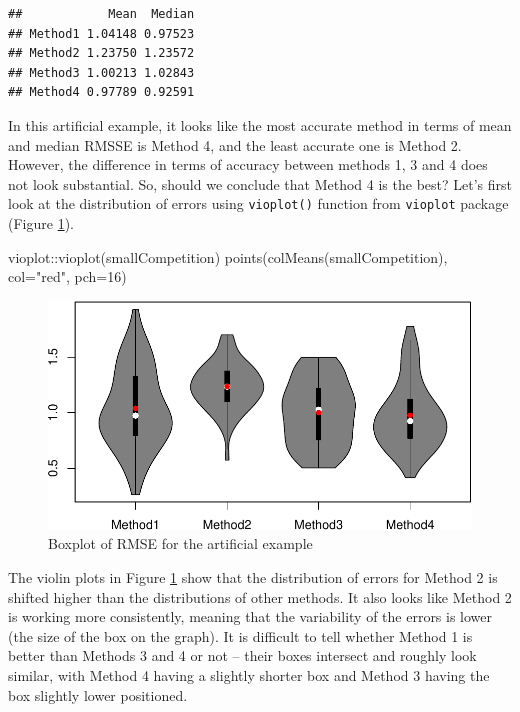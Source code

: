 \documentclass[
]{book}
\newenvironment{Shaded}{\begin{snugshade}}{\end{snugshade}}
\newcommand{\AttributeTok}[1]{\textcolor[rgb]{0.77,0.63,0.00}{#1}}
\newcommand{\DecValTok}[1]{\textcolor[rgb]{0.00,0.00,0.81}{#1}}
\newcommand{\FunctionTok}[1]{\textcolor[rgb]{0.00,0.00,0.00}{#1}}
\newcommand{\NormalTok}[1]{#1}
\newcommand{\SpecialCharTok}[1]{\textcolor[rgb]{0.00,0.00,0.00}{#1}}
\newcommand{\StringTok}[1]{\textcolor[rgb]{0.31,0.60,0.02}{#1}}
\theoremstyle{definition}
\theoremstyle{definition}
\theoremstyle{definition}
\theoremstyle{definition}
\theoremstyle{remark}
\begin{document}
\begin{verbatim}
##            Mean  Median
## Method1 1.04148 0.97523
## Method2 1.23750 1.23572
## Method3 1.00213 1.02843
## Method4 0.97789 0.92591
\end{verbatim}

In this artificial example, it looks like the most accurate method in terms of mean and median RMSSE is Method 4, and the least accurate one is Method 2. However, the difference in terms of accuracy between methods 1, 3 and 4 does not look substantial. So, should we conclude that Method 4 is the best? Let's first look at the distribution of errors using \texttt{vioplot()} function from \texttt{vioplot} package (Figure \ref{fig:smallCompetitionBoxplot}).

\begin{Shaded}
\begin{Highlighting}[]
\NormalTok{vioplot}\SpecialCharTok{::}\FunctionTok{vioplot}\NormalTok{(smallCompetition)}
\FunctionTok{points}\NormalTok{(}\FunctionTok{colMeans}\NormalTok{(smallCompetition), }\AttributeTok{col=}\StringTok{"red"}\NormalTok{, }\AttributeTok{pch=}\DecValTok{16}\NormalTok{)}
\end{Highlighting}
\end{Shaded}

\begin{figure}
\centering
\includegraphics{Svetunkov--2022----ADAM_files/figure-latex/smallCompetitionBoxplot-1.pdf}
\caption{\label{fig:smallCompetitionBoxplot}Boxplot of RMSE for the artificial example}
\end{figure}

The violin plots in Figure \ref{fig:smallCompetitionBoxplot} show that the distribution of errors for Method 2 is shifted higher than the distributions of other methods. It also looks like Method 2 is working more consistently, meaning that the variability of the errors is lower (the size of the box on the graph). It is difficult to tell whether Method 1 is better than Methods 3 and 4 or not -- their boxes intersect and roughly look similar, with Method 4 having a slightly shorter box and Method 3 having the box slightly lower positioned.
\end{document}
